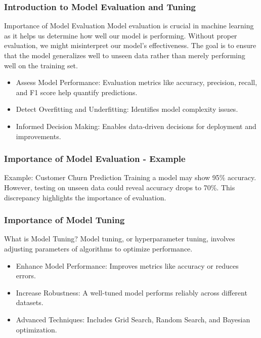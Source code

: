 \documentclass[aspectratio=169]{beamer}
\begin{document}
\frame{\titlepage}

\begin{frame}[fragile]
    \frametitle{Introduction to Model Evaluation and Tuning}
    \begin{block}{Importance of Model Evaluation}
        Model evaluation is crucial in machine learning as it helps us determine how well our model is performing. 
        Without proper evaluation, we might misinterpret our model’s effectiveness. 
        The goal is to ensure that the model generalizes well to unseen data rather than merely performing well on the training set.
    \end{block}
    \begin{itemize}
        \item Assess Model Performance: Evaluation metrics like accuracy, precision, recall, and F1 score help quantify predictions.
        \item Detect Overfitting and Underfitting: Identifies model complexity issues.
        \item Informed Decision Making: Enables data-driven decisions for deployment and improvements.
    \end{itemize}
\end{frame}

\begin{frame}[fragile]
    \frametitle{Importance of Model Evaluation - Example}
    \begin{block}{Example: Customer Churn Prediction}
        Training a model may show 95\% accuracy. However, testing on unseen data could reveal accuracy drops to 70\%. 
        This discrepancy highlights the importance of evaluation.
    \end{block}
\end{frame}

\begin{frame}[fragile]
    \frametitle{Importance of Model Tuning}
    \begin{block}{What is Model Tuning?}
        Model tuning, or hyperparameter tuning, involves adjusting parameters of algorithms to optimize performance.
    \end{block}
    \begin{itemize}
        \item Enhance Model Performance: Improves metrics like accuracy or reduces errors.
        \item Increase Robustness: A well-tuned model performs reliably across different datasets.
        \item Advanced Techniques: Includes Grid Search, Random Search, and Bayesian optimization.
    \end{itemize}
\end{frame}
\end{document}
